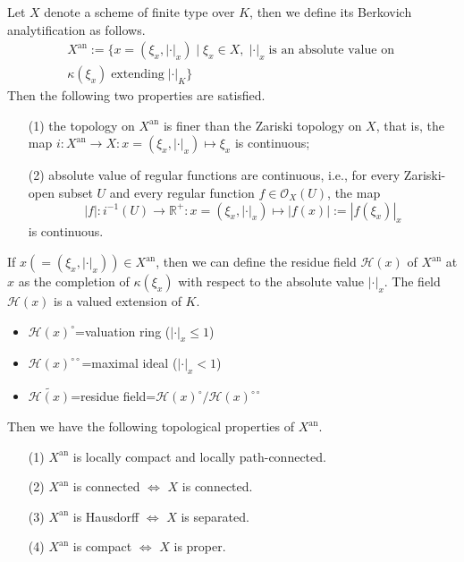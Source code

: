 Let $X$ denote a scheme of finite type over $K$, then we define its Berkovich analytification as follows.
\begin{multline*}
X^{\mathrm{an}}:=\{x=(\xi_{x},|\cdot|_{x})\mid \xi_{x}\in X,\; |\cdot|_{x} \; \text{is an absolute value
on}\; \\ \kappa(\xi_{x}) \; \text{extending}\; |\cdot|_{K}\}
\end{multline*}
Then the following two properties are satisfied.
\begin{itemize}
  \item [(1)] the topology on $X^{\mathrm{an}}$ is finer than the Zariski topology on $X$, that is, the map
        $i:X^{\mathrm{an}}\rightarrow X: x=(\xi_{x},|\cdot|_{x})\mapsto\xi_{x}$ is continuous;
  \item [(2)] absolute value of regular functions are continuous, i.e., for every Zariski-open subset $U$ and
        every regular function $f\in\mathcal{O}_{X}(U)$, the map
        \[ |f|:i^{-1}(U)\rightarrow\mathbb{R}^{+}:x=(\xi_{x},|\cdot|_{x})\mapsto |f(x)|:=|f(\xi_{x})|_{x} \]
        is continuous.
\end{itemize}

If $x(=(\xi_{x},|\cdot|_{x}))\in X^{\mathrm{an}}$, then we can define the residue field $\mathscr{H}(x)$ of $X^{\mathrm{an}}$ at $x$
as the completion of $\kappa(\xi_{x})$ with respect to the absolute value $|\cdot|_{x}$. The field $\mathscr{H}(x)$
is a valued extension of $K$.
\begin{itemize}
  \item $\mathscr{H}(x)^{\circ}$=valuation ring ($|\cdot|_{x}\leq 1$)
  \item $\mathscr{H}(x)^{\circ\circ}$=maximal ideal ($|\cdot|_{x}< 1$)
  \item $\widetilde{\mathscr{H}(x)}$=residue field=$\mathscr{H}(x)^{\circ}/\mathscr{H}(x)^{\circ\circ}$
\end{itemize}

Then we have the following topological properties of $X^{\mathrm{an}}$.
\begin{itemize}
  \item [(1)] $X^{\mathrm{an}}$ is locally compact and locally path-connected.
  \item [(2)] $X^{\mathrm{an}}$ is connected $\Leftrightarrow$ $X$ is connected.
  \item [(3)] $X^{\mathrm{an}}$ is Hausdorff $\Leftrightarrow$ $X$ is separated.
  \item [(4)] $X^{\mathrm{an}}$ is compact $\Leftrightarrow$ $X$ is proper.
\end{itemize}

